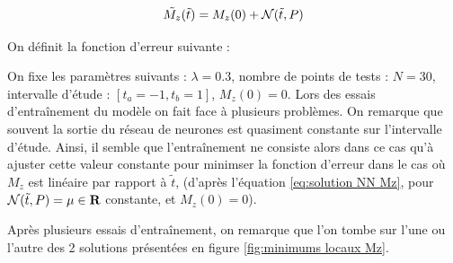 \documentclass[12pt]{report}
\begin{document}
\begin{equation}
    \Tilde{M_z}(\Tilde{t}) = M_z(0) + {\mathcal{N}}(\Tilde{t},P) 
    \label{eq:solution NN Mz}
\end{equation}

On définit la fonction d'erreur suivante :


On fixe les paramètres suivants : $\lambda = 0.3$, nombre de points de tests : $N=30$, 
intervalle d'étude : $[t_a = -1, t_b = 1]$, $M_z(0) = 0$.
Lors des essais d'entraînement du modèle on fait face à plusieurs problèmes.
On remarque que souvent la sortie du réseau de neurones est quasiment constante
sur l'intervalle d'étude. Ainsi, il semble que l'entraînement ne consiste alors dans ce 
cas qu'à ajuster cette valeur constante pour minimser la fonction d'erreur dans le cas 
où $M_z$ est linéaire par rapport à $\tilde{t}$, (d'après l'équation \ref{eq:solution NN Mz},
pour ${\mathcal{N}}(\Tilde{t},P) = \mu\in \mathbf{R}$ constante, et $M_z(0) = 0$).

Après plusieurs essais d'entraînement, on remarque que l'on tombe sur l'une ou l'autre des 2 solutions
présentées en figure \ref{fig:minimums locaux Mz}.
\end{document}
